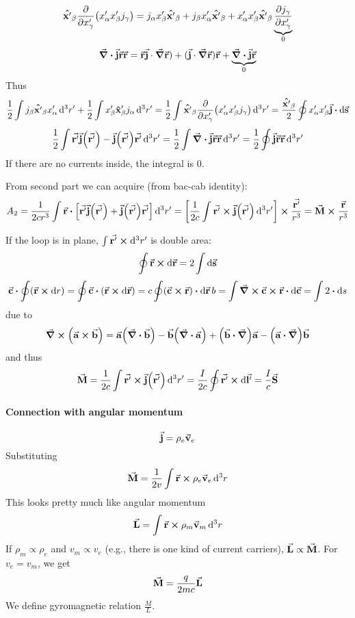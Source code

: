 $$\vu{x'}_\beta \pdv{x'_\gamma} \qty(x'_\alpha x'_\beta j_\gamma ) = j_\alpha x'_\beta \vu{x'}_\beta + j_\beta x'_\alpha \vu{x'}_\beta + x'_\alpha x'_\beta \vu{x'}_\beta \underbrace{\pdv{j_\gamma}{x'_\gamma}}_{0} $$
$$\div{\va{j}\va{r}\va{r}} = \va{r}\va{j}\cdot \grad{\va{r}}) + (\va{j}\cdot \grad{\va{r}})\va{r} + \underbrace{\div{\va{j}}\va{r}}_{0}$$
Thus
$$ \frac{1}{2} \int j_\beta \vu{x'}_\beta  x'_\alpha \dd[3]{r'} + \frac{1}{2} \int x'_\beta \vu{x}'_\beta j_\alpha \dd[3]{r'} =\frac{1}{2} \int \vu{x'}_\beta \pdv{x'_\gamma} \qty(x'_\alpha x'_\beta j_\gamma )  \dd[3]{r'} =  \frac{\vu{x'}_\beta}{2} \oint  x'_\alpha x'_\beta \va{j} \vdot \dd{\va{s}}$$
$$ \frac{1}{2}\int \va{r'} \va{j}\qty(\va{r'}) -\va{j}\qty(\va{r'})\va{r'}  \dd[3]{r'} = \frac{1}{2}\int \div{\va{j}\va{r}\va{r}} \dd[3]{r'} = \frac{1}{2} \oint \va{j}\va{r}\va{r} \dd[3]{r'}$$
If there are no currents inside, the integral is 0.

From second part we can acquire (from bac-cab identity):
$$A_2  = \frac{1}{2cr^3} \int \va{r} \vdot \qty[\va{r'} \va{j}\qty(\va{r'}) +\va{j}\qty(\va{r'})\va{r'}  ]\dd[3]{r'} = \qty[\frac{1}{2c} \int \va{r'} \cross \va{j}\qty(\va{r'}) \dd[3]{r'} ] \cross \frac{\va{r'}}{r^3} = \va{M} \cross \frac{\va{r}}{r^3}$$ 

If the loop is in plane,  $\int \va{r'} \cross \dd[3]{r'}$ is double area:
$$\oint \va{r} \cross \dd{\va{r}} = 2\int \dd{\va{s}}$$
$$\va{c} \vdot \oint (\va{r} \cross \dd{r}) = \oint \va{c} \vdot (\va{r} \cross \dd{\va{r}}) =c\oint (\va{c} \cross \va{r}) \vdot \dd{\va{r}}b= \int \curl{\va{c} \cross \va{r}} \vdot \dd{\va{c}} = \int 2 \vdot \dd{s}$$
due to
$$\curl(\va{a} \cross \va{b}) = \va{a} \qty(\div{\va{b}})-\va{b} \qty(\div{\va{a}}) + \qty(\va{b}\vdot \grad)\va{a} - \qty(\va{a}\vdot \grad)\va{b}$$
 and thus
$$\va{M} = \frac{1}{2c} \int \va{r'} \cross \va{j}\qty(\va{r'}) \dd[3]{r'} = \frac{I}{2c} \oint \va{r'} \cross \dd{\va{l'}} = \frac{I}{c} \va{S}$$

\paragraph{Connection with angular momentum}
$$\va{j} = \rho_e \va{v}_e$$
Substituting
$$\va{M} = \frac{1}{2v} \int \va{r} \cross \rho_e \va{v}_e \dd[3]{r}$$
This looks pretty much like angular momentum
$$\va{L} =  \int \va{r} \cross \rho_m \va{v}_m \dd[3]{r}$$
If $\rho_m \propto \rho_e$ and $v_m \propto v_e$ (e.g., there is one kind of current carriers), $\va{L}\propto \va{M}$. For $v_e=v_m$, we get
$$\va{M} = \frac{q}{2mc} \va{L}$$
We define gyromagnetic relation $\frac{M}{L}$.
